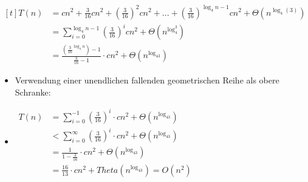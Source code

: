 \documentclass[
    ngerman,
    color=3b,
    dark_mode,
    load_common, %
    summary,
    boxarc,
]{rubos-tuda-template}
\begin{document}
\begin{description}[itemsep=.8em]
          $\begin{aligned}[t]
                  T(n) & = cn^2 + \frac{3}{16}cn^2 + (\frac{3}{16})^2cn^2+...+ (\frac{3}{16})^{\log_4n-1}cn^2 + \Theta(n^{\log_4(3)}) \\
                       & = \sum\nolimits^{\log_4n-1}_{i=0} (\frac{3}{16})^icn^2+ \Theta(n^{\log_4^3})                                 \\
                       & = \frac{(\frac{3}{16}^{\log_4n})-1}{\frac{3}{16}-1} \cdot cn^2 + \Theta(n^{\log_43})
              \end{aligned}$
          \begin{itemize}
              \item Verwendung einer unendlichen fallenden geometrischen Reihe als obere Schranke:
              \item[] $\begin{aligned}T(n) & = \sum\nolimits^{-1}_{i=0} (\frac{3}{16})^i \cdot cn^2 + \Theta(n^{\log_43})     \\
                    & < \sum\nolimits^{\infty}_{i=0} (\frac{3}{16})^i \cdot cn^2 + \Theta(n^{\log_43}) \\
                    & = \frac{1}{1-\frac{3}{16}} \cdot cn^2 + \Theta(n^{\log_43})                      \\
                    & = \frac{16}{13} \cdot cn^2 + Theta(n^{\log_43}) = O(n^2)
                      \end{aligned}$
          \end{itemize}
    \item [Jetzt \textbf{Subsitutionsmethode}]
\end{description}
\end{document}
